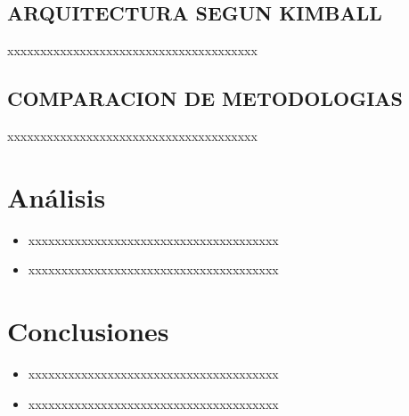 \documentclass[%
 reprint,
 amsmath,amssymb,
 aps,
]{revtex4-1}
\begin{document}
\subsection{ARQUITECTURA SEGUN KIMBALL}

xxxxxxxxxxxxxxxxxxxxxxxxxxxxxxxxxxxxxx 


\subsection{COMPARACION DE METODOLOGIAS}	
xxxxxxxxxxxxxxxxxxxxxxxxxxxxxxxxxxxxxx

\section{Análisis}

\begin{itemize}
\item xxxxxxxxxxxxxxxxxxxxxxxxxxxxxxxxxxxxxx 
\item xxxxxxxxxxxxxxxxxxxxxxxxxxxxxxxxxxxxxx 
\end{itemize}
\section{Conclusiones}

\begin{itemize}
\item xxxxxxxxxxxxxxxxxxxxxxxxxxxxxxxxxxxxxx 
\item xxxxxxxxxxxxxxxxxxxxxxxxxxxxxxxxxxxxxx 

\end{itemize}






\end{document}
